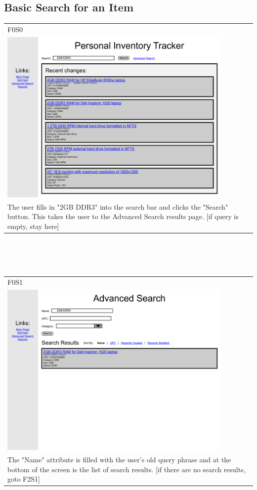 \documentclass{article}
\begin{document}
\subsection{Basic Search for an Item}
\begin{tabular}{ p{4.5in} }
F0S0\\
\includegraphics[keepaspectratio, width=4.5in]{basicSearchF0S0.pdf} \\
The user fills in "2GB DDR3" into the search bar and clicks the "Search" button. This takes the user to the Advanced Search results page. [if query is empty, stay here]
\end{tabular}\\
~\\
~\\
\begin{tabular}{ p{4.5in} }
F0S1\\
\includegraphics[keepaspectratio, width=4.5in]{basicSearchF0S1.pdf} \\
The "Name" attribute is filled with the user's old query phrase and at the bottom of the screen is the list of search results. [if there are no search results, goto F2S1]
\end{tabular}\\
\end{document}
